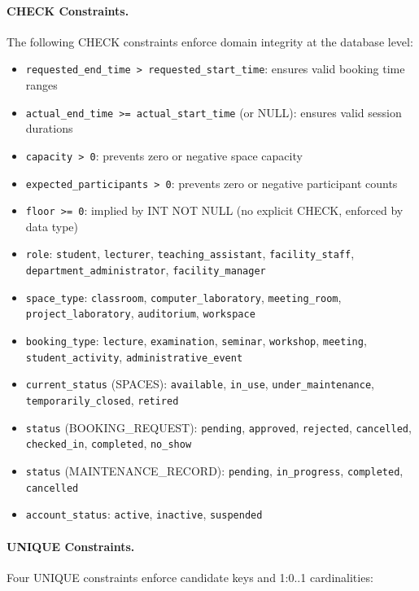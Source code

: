 \paragraph{CHECK Constraints.}
The following CHECK constraints enforce domain integrity at the database level:

\begin{itemize}
	\item \texttt{requested\_end\_time > requested\_start\_time}: ensures valid booking time ranges
	\item \texttt{actual\_end\_time >= actual\_start\_time} (or NULL): ensures valid session durations
	\item \texttt{capacity > 0}: prevents zero or negative space capacity
	\item \texttt{expected\_participants > 0}: prevents zero or negative participant counts
	\item \texttt{floor >= 0}: implied by INT NOT NULL (no explicit CHECK, enforced by data type)
	\item \texttt{role}: \texttt{student}, \texttt{lecturer}, \texttt{teaching\_assistant}, \texttt{facility\_staff}, \\ \texttt{department\_administrator}, \texttt{facility\_manager}
	\item \texttt{space\_type}: \texttt{classroom}, \texttt{computer\_laboratory}, \texttt{meeting\_room}, \texttt{project\_laboratory}, \texttt{auditorium}, \texttt{workspace}
	\item \texttt{booking\_type}: \texttt{lecture}, \texttt{examination}, \texttt{seminar}, \texttt{workshop}, \texttt{meeting}, \texttt{student\_activity}, \texttt{administrative\_event}
	\item \texttt{current\_status} (SPACES): \texttt{available}, \texttt{in\_use}, \texttt{under\_maintenance}, \\ \texttt{temporarily\_closed}, \texttt{retired}
	\item \texttt{status} (BOOKING\_REQUEST): \texttt{pending}, \texttt{approved}, \texttt{rejected}, \texttt{cancelled}, \texttt{checked\_in}, \texttt{completed}, \texttt{no\_show}
	\item \texttt{status} (MAINTENANCE\_RECORD): \texttt{pending}, \texttt{in\_progress}, \texttt{completed}, \texttt{cancelled}
	\item \texttt{account\_status}: \texttt{active}, \texttt{inactive}, \texttt{suspended}
\end{itemize}

\paragraph{UNIQUE Constraints.}
Four UNIQUE constraints enforce candidate keys and 1:0..1 cardinalities:

